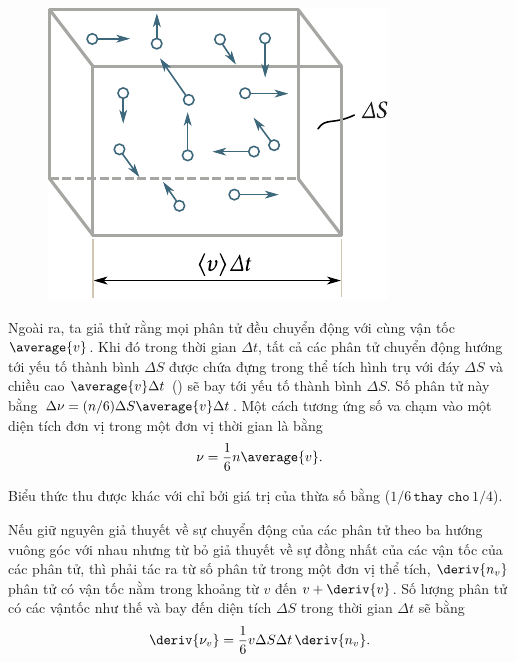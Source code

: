 \begin{figure}[!htb]
	\begin{center}
		\includegraphics[scale=1.0]{figures/ch_11/fig_11_6.pdf}
		\caption[]{}
		\label{fig:11_6}
	\end{center}
	\vspace{-0.8cm}
\end{figure}
Ngoài ra, ta giả thử rằng mọi phân tử đều chuyển động với cùng vận tốc  $\average{v}$. Khi đó trong thời gian $\Delta t$, tất cả các phân tử chuyển động hướng tới yếu tố thành bình $\Delta S$ được chứa đựng trong thể tích hình trụ với đáy $\Delta S$ và chiều cao $\average{v}\Delta t$ () sẽ bay tới yếu tố thành bình $\Delta S$. Số phân tử này bằng $\Delta\nu=(n/6)\Delta S\average{v}\Delta t$. Một cách tương ứng số va chạm vào một diện tích đơn vị trong một đơn vị thời gian là bằng
\begin{equation}\label{eq:11_24}
	\nu = \frac{1}{6}n\average{v}.
\end{equation}

\noindent


Biểu thức thu được khác với  chỉ bởi giá trị của thừa số bằng ($1/6\, \texttt{thay cho}\, 1/4$).

Nếu giữ nguyên giả thuyết về sự chuyển động của các phân tử theo ba hướng vuông góc với nhau nhưng từ bỏ giả thuyết về sự đồng nhất của các vận tốc của các phân tử, thì phải tác ra từ số phân tử trong một đơn vị thể tích, $\deriv{n_v}$ phân tử có vận tốc nằm trong khoảng từ $v$ đến $v+\deriv{v}$. Số lượng phân tử có các vậntốc như thế và bay đến diện tích $\Delta S$ trong thời gian $\Delta t$ sẽ bằng
\begin{equation}\label{eq:11_25}
	\deriv{\nu_v} = \frac{1}{6}v\Delta S \Delta t\,\deriv{n_v}.
\end{equation}

